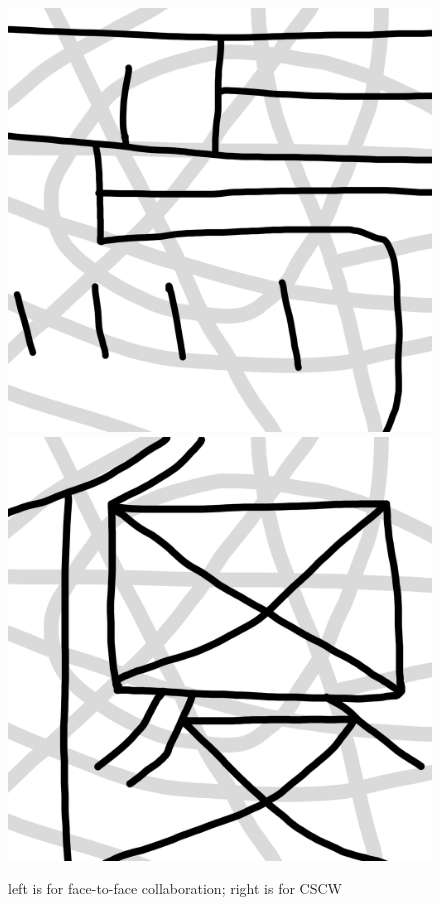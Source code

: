\documentclass[12pt,twoside]{article}
\begin{document}
\begin{figure}
\centering
\includegraphics[scale=0.2]{img/user_task_puzzle1.jpg}\hspace{1cm}
\includegraphics[scale=0.2]{img/user_task_puzzle2.jpg}
\caption{left is for face-to-face collaboration; right is for CSCW}
\end{figure}
\end{document}

